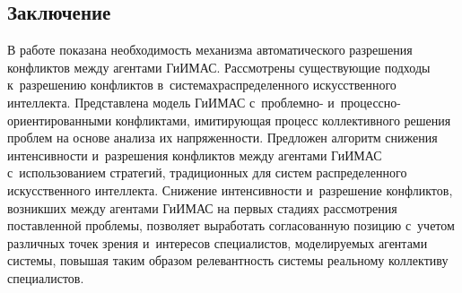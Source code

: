 \begin{multicols}{2}
\section{Заключение}

  В работе показана необходимость механизма автоматического разрешения 
конфликтов между агентами \mbox{ГиИМАС}. Рассмотрены существующие\linebreak 
подходы к~разрешению конфликтов в~сис\-те\-мах\linebreak распределенного 
искусственного интеллекта. Пред\-став\-ле\-на модель \mbox{ГиИМАС} 
с~проблемно- и~про\-цес\-сно-ори\-ен\-ти\-ро\-ван\-ны\-ми конфликтами, 
имитирующая процесс коллективного решения проб\-лем на основе анализа их 
напряженности. Предложен алгоритм снижения ин\-тен\-сив\-ности и~разрешения 
конфликтов между агентами \mbox{ГиИМАС} с~использованием стратегий, 
традиционных для сис\-тем распределенного искусственного интеллекта. 
Снижение интенсивности и~разрешение конфликтов, \mbox{возникших} между 
агентами \mbox{ГиИМАС} на первых стадиях рас\-смот\-ре\-ния по\-став\-лен\-ной 
проблемы, поз\-во\-ля\-ет выработать согласованную позицию с~учетом различных 
точек зрения и~интересов специалистов, мо\-де\-ли\-ру\-емых агентами сис\-те\-мы, 
повышая таким образом ре\-ле\-вант\-ность сис\-те\-мы реальному коллективу 
специалистов. 
  

\end{multicols}
